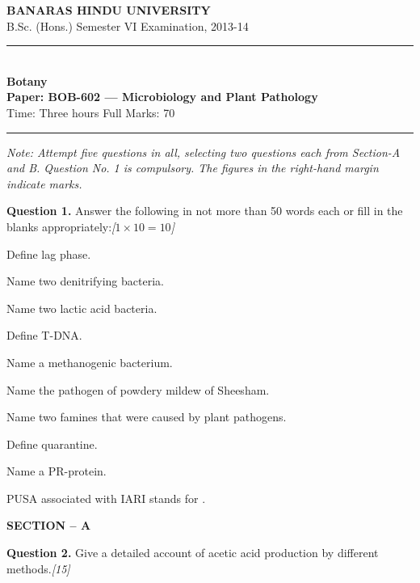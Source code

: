 \documentclass[11pt,a4paper]{article}
\newcommand{\pts}[1]{\hfill   \textit{[#1]}}
\begin{document}
\begin{center}
  {\large\bfseries BANARAS HINDU UNIVERSITY}\\[2pt]
  {\normalsize B.Sc. (Hons.) Semester VI Examination, 2013-14}\\[6pt]
  \rule{0.8\linewidth}{0.5pt}\\[6pt]
  {\large\bfseries Botany}\\[4pt]
  {\large\bfseries Paper: BOB-602 --- Microbiology and Plant Pathology}\\[4pt]
  {\normalsize Time: Three hours \hfill Full Marks: 70}
\end{center}

\rule{\linewidth}{0.4pt}

\smallskip



\noindent   \textit{Note: Attempt five questions in all, selecting two questions each from Section-A and B. Question No. 1 is compulsory. The figures in the right-hand margin indicate marks.}

\bigskip

\medskip


\noindent   \textbf{Question 1.} Answer the following in not more than 50 words each or fill in the blanks appropriately:\pts{$1  \times 10 = 10$}

\begin{parts}
  \item Define lag phase.
  \item Name two denitrifying bacteria.
  \item Name two lactic acid bacteria.
  \item Define T-DNA.
  \item Name a methanogenic bacterium.
  \item Name the pathogen of powdery mildew of Sheesham.
  \item Name two famines that were caused by plant pathogens.
  \item Define quarantine.
  \item Name a PR-protein.
  \item PUSA associated with IARI stands for \makebox[3cm]{\hrulefill}.
\end{parts}

\bigskip

\begin{center}
   \textbf{SECTION -- A}
\end{center}

\medskip


\noindent   \textbf{Question 2.} Give a detailed account of acetic acid production by different methods.\pts{15}
\end{document}
